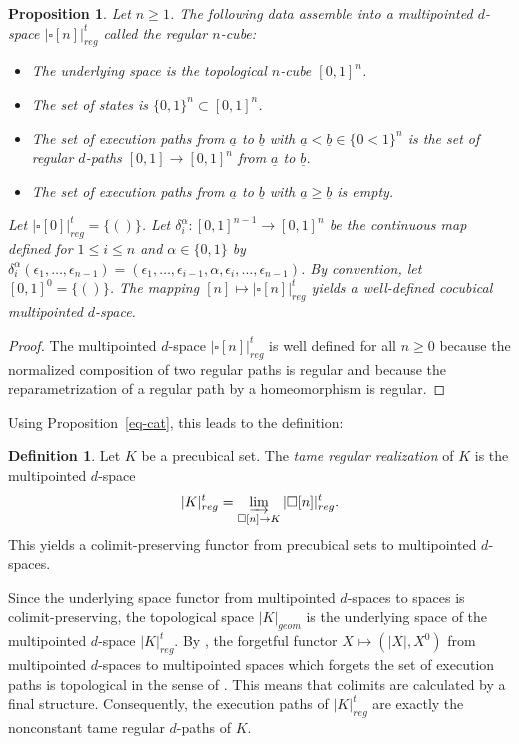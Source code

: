 \documentclass[a4paper,12pt]{amsart}
\newtheorem{prop}[thm]{Proposition}
\newcommand{\bp}{\begin{prop}}
\newcommand{\ep}{\end{prop}}
\newcommand{\bpf}{\begin{proof}}
\newcommand{\epf}{\end{proof}}
\theoremstyle{definition}
\newtheorem{defn}[thm]{Definition}
\newcommand{\bd}{\begin{defn}}
\newcommand{\ed}{\end{defn}}
\renewcommand{\leq}{\leqslant}
\renewcommand{\geq}{\geqslant}
\newcommand{\liminj}{\varinjlim}
\begin{document}
\bp \label{cocubical-reg-cube}
Let $n\geq 1$. The following data assemble into a multipointed $d$-space $|\square[n]|^t_{reg}$ called the \textit{regular $n$-cube}:
\begin{itemize}
	\item The underlying space is the topological $n$-cube $[0,1]^n$.
	\item The set of states is $\{0,1\}^n\subset [0,1]^n$.
	\item The set of execution paths from $\underline{a}$ to $\underline{b}$ with $\underline{a}<\underline{b} \in \{0<1\}^n$ is the set of regular $d$-paths $[0,1]\to [0,1]^n$ from $\underline{a}$ to $\underline{b}$.
	\item The set of execution paths from $\underline{a}$ to $\underline{b}$ with $\underline{a}\geq \underline{b}$ is empty.
\end{itemize}
Let $|\square[0]|^t_{reg} = \{()\}$. 	Let $\delta_i^\alpha : [0,1]^{n-1} \rightarrow [0,1]^n$ be the continuous map defined for $1\leq i\leq n$ and $\alpha \in \{0,1\}$ by $\delta_i^\alpha(\epsilon_1, \dots, \epsilon_{n-1}) = (\epsilon_1,\dots, \epsilon_{i-1}, \alpha, \epsilon_i, \dots, \epsilon_{n-1})$. By convention, let $[0,1]^0=\{()\}$. The mapping $[n]\mapsto |\square[n]|^t_{reg}$ yields a well-defined cocubical multipointed $d$-space.
\ep

\bpf
The multipointed $d$-space $|\square[n]|^t_{reg}$ is well defined for all $n\geq 0$ because the normalized composition of two regular paths is regular and because the reparametrization of a regular path by a homeomorphism is regular.
\epf

Using Proposition~\ref{eq-cat}, this leads to the definition: 

\bd \label{treg_rea}
Let $K$ be a precubical set. The \textit{tame regular realization} of $K$ is the multipointed $d$-space 
\[
|K|^t_{reg} = \liminj_{\square[n]\rightarrow K} |\square[n]|^t_{reg}.
\]
This yields a colimit-preserving functor from precubical sets to multipointed $d$-spaces.
\ed

Since the underlying space functor from multipointed $d$-spaces to spaces is colimit-preserving, the topological space $|K|_{geom}$ is the underlying space of the multipointed $d$-space $|K|^t_{reg}$. By \cite[Proposition~6.5]{QHMmodel}, the forgetful functor $X\mapsto (|X|,X^0)$ from multipointed $d$-spaces to multipointed spaces which forgets the set of execution paths is topological in the sense of \cite[Definition~21.1]{topologicalcat}. This means that colimits are calculated by a final structure. Consequently, the execution paths of $|K|^t_{reg}$ are exactly the nonconstant tame  regular $d$-paths of $K$.
\end{document}
